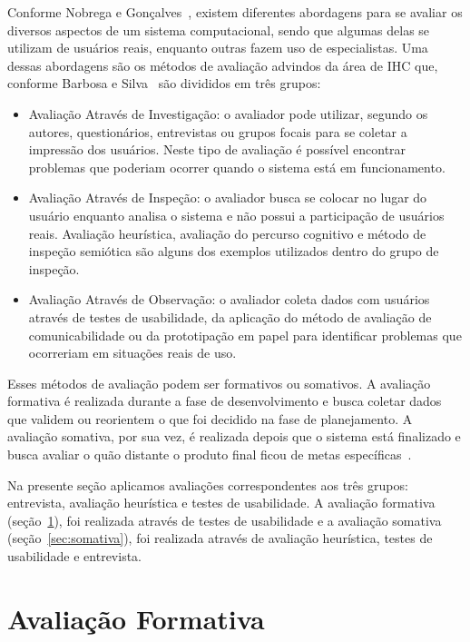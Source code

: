 Conforme Nobrega e Gonçalves~\cite{nobrega_metodo_2013}, existem diferentes abordagens para se avaliar os diversos aspectos de um sistema computacional, sendo que algumas delas se utilizam de usuários reais, enquanto outras fazem uso de especialistas. Uma dessas abordagens são os métodos de avaliação advindos da área de \acrfull{IHC} que, conforme Barbosa e Silva~\cite{barbosa2010interacao} são divididos em três grupos:

\begin{itemize}
	\item Avaliação Através de Investigação: o avaliador pode utilizar, segundo os autores, questionários, entrevistas ou grupos focais para se coletar a impressão dos usuários. Neste tipo de avaliação é possível encontrar problemas que poderiam ocorrer quando o sistema está em funcionamento.
	\item Avaliação Através de Inspeção: o avaliador busca se colocar no lugar do usuário enquanto analisa o sistema e não possui a participação de usuários reais. Avaliação heurística, avaliação do percurso cognitivo e método de inspeção semiótica são alguns dos exemplos utilizados dentro do grupo de inspeção.
	\item Avaliação Através de Observação: o avaliador coleta dados com usuários através de testes de usabilidade, da aplicação do método de avaliação de comunicabilidade ou da prototipação em papel para identificar problemas que ocorreriam em situações reais de uso.
\end{itemize}

Esses métodos de avaliação podem ser formativos ou somativos. A avaliação formativa é realizada durante a fase de desenvolvimento e busca coletar dados que validem ou reorientem o que foi decidido na fase de planejamento. A avaliação somativa, por sua vez, é realizada depois que o sistema está finalizado e busca avaliar o quão distante o produto final ficou de metas específicas~\cite{barbosa2010interacao}.

Na presente seção aplicamos avaliações correspondentes aos três grupos: entrevista, avaliação heurística e testes de usabilidade. A avaliação formativa (seção~\ref{sec:formativa}), foi realizada através de testes de usabilidade e a avaliação somativa (seção~\ref{sec:somativa}), foi realizada através de avaliação heurística, testes de usabilidade e entrevista.

\section{Avaliação Formativa} \label{sec:formativa}

